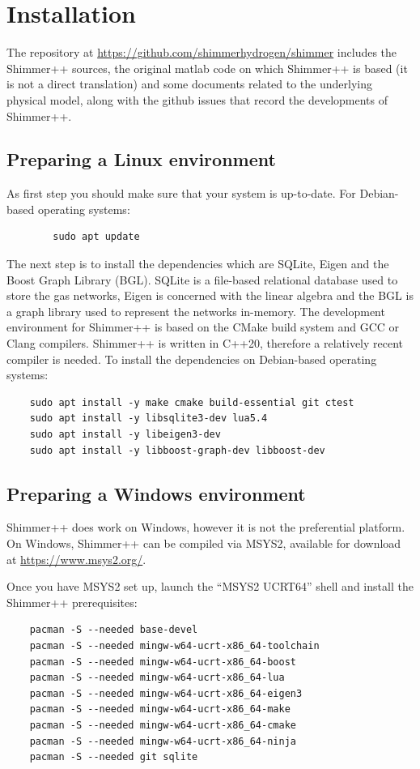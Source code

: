 \clearpage
\section{Installation}
\label{sec:installation}
The repository at \url{https://github.com/shimmerhydrogen/shimmer} includes the Shimmer++ sources, the original matlab code on which Shimmer++ is based (it is not a direct translation) and some documents related to the underlying physical model, along with the github issues that record the developments of Shimmer++.  
\subsection{Preparing a Linux environment}
As first step you should make sure that your system is up-to-date. For Debian-based operating systems: 
    \begin{verbatim}
        sudo apt update
    \end{verbatim}    
The next step is to install the dependencies which are SQLite, Eigen and the Boost Graph Library (BGL). SQLite is a file-based relational database used to store the gas networks, Eigen is concerned with the linear algebra and the BGL is a graph library used to represent the networks in-memory. The development environment for Shimmer++ is based on the CMake build system and GCC or Clang compilers. Shimmer++ is written in C++20, therefore a relatively recent compiler is needed.
To install the dependencies on Debian-based operating systems:
\begin{verbatim}
    sudo apt install -y make cmake build-essential git ctest
    sudo apt install -y libsqlite3-dev lua5.4
    sudo apt install -y libeigen3-dev
    sudo apt install -y libboost-graph-dev libboost-dev
\end{verbatim}

\subsection{Preparing a Windows environment}
Shimmer++ does work on Windows, however it is not the preferential platform. On Windows, Shimmer++ can be compiled via MSYS2, available for download at \url{https://www.msys2.org/}.

Once you have MSYS2 set up, launch the ``MSYS2 UCRT64'' shell and install the Shimmer++ prerequisites:
\begin{verbatim}
    pacman -S --needed base-devel
    pacman -S --needed mingw-w64-ucrt-x86_64-toolchain
    pacman -S --needed mingw-w64-ucrt-x86_64-boost
    pacman -S --needed mingw-w64-ucrt-x86_64-lua
    pacman -S --needed mingw-w64-ucrt-x86_64-eigen3
    pacman -S --needed mingw-w64-ucrt-x86_64-make
    pacman -S --needed mingw-w64-ucrt-x86_64-cmake
    pacman -S --needed mingw-w64-ucrt-x86_64-ninja
    pacman -S --needed git sqlite
\end{verbatim}

